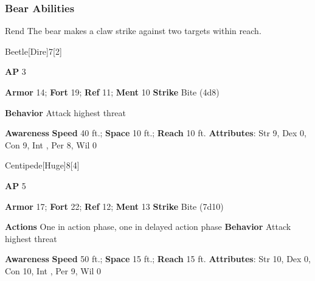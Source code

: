 \subsubsection{Bear Abilities}

\begin{ability}{Rend}
The bear makes a claw strike against two targets within reach.
\end{ability}

\begin{monsection}{Beetle}[Dire]{7}[2]
\vspace{-1em}\vspace{-1em}
\begin{spellcontent}
\begin{spelltargetinginfo}
{\textbf{AP} 3}

\pari \textbf{Armor} 14;
\textbf{Fort} 19;
\textbf{Ref} 11;
\textbf{Ment} 10
\pari \textbf{Strike} Bite  (4d8)



\pari \textbf{Behavior} Attack highest threat
\end{spelltargetinginfo}
\end{spellcontent}

\begin{monsterfooter}
\pari \textbf{Awareness} 
\pari \textbf{Speed} 40 ft.;
\textbf{Space} 10 ft.;
\textbf{Reach} 10 ft.
\pari \textbf{Attributes}:
Str 9,
Dex 0,
Con 9,
Int ,
Per 8,
Wil 0
\end{monsterfooter}
\end{monsection}

\begin{monsection}{Centipede}[Huge]{8}[4]
\vspace{-1em}\vspace{-1em}
\begin{spellcontent}
\begin{spelltargetinginfo}
{\textbf{AP} 5}

\pari \textbf{Armor} 17;
\textbf{Fort} 22;
\textbf{Ref} 12;
\textbf{Ment} 13
\pari \textbf{Strike} Bite  (7d10)


\pari \textbf{Actions} One in action phase, one in delayed action phase
\pari \textbf{Behavior} Attack highest threat
\end{spelltargetinginfo}
\end{spellcontent}

\begin{monsterfooter}
\pari \textbf{Awareness} 
\pari \textbf{Speed} 50 ft.;
\textbf{Space} 15 ft.;
\textbf{Reach} 15 ft.
\pari \textbf{Attributes}:
Str 10,
Dex 0,
Con 10,
Int ,
Per 9,
Wil 0
\end{monsterfooter}
\end{monsection}

